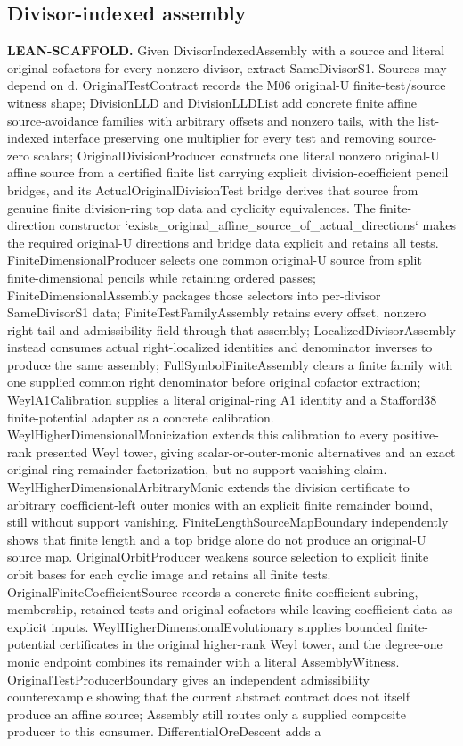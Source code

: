\subsection{Divisor-indexed assembly}\hypertarget{claim:assembly-scaffold}{}\backmap
\textbf{LEAN-SCAFFOLD.} Given DivisorIndexedAssembly with a source and literal original cofactors for every nonzero divisor, extract SameDivisorS1. Sources may depend on d. OriginalTestContract records the M06 original-U finite-test/source witness shape; DivisionLLD and DivisionLLDList add concrete finite affine source-avoidance families with arbitrary offsets and nonzero tails, with the list-indexed interface preserving one multiplier for every test and removing source-zero scalars; OriginalDivisionProducer constructs one literal nonzero original-U affine source from a certified finite list carrying explicit division-coefficient pencil bridges, and its ActualOriginalDivisionTest bridge derives that source from genuine finite division-ring top data and cyclicity equivalences. The finite-direction constructor `exists\_original\_affine\_source\_of\_actual\_directions` makes the required original-U directions and bridge data explicit and retains all tests. FiniteDimensionalProducer selects one common original-U source from split finite-dimensional pencils while retaining ordered passes; FiniteDimensionalAssembly packages those selectors into per-divisor SameDivisorS1 data; FiniteTestFamilyAssembly retains every offset, nonzero right tail and admissibility field through that assembly; LocalizedDivisorAssembly instead consumes actual right-localized identities and denominator inverses to produce the same assembly; FullSymbolFiniteAssembly clears a finite family with one supplied common right denominator before original cofactor extraction; WeylA1Calibration supplies a literal original-ring A1 identity and a Stafford38 finite-potential adapter as a concrete calibration. WeylHigherDimensionalMonicization extends this calibration to every positive-rank presented Weyl tower, giving scalar-or-outer-monic alternatives and an exact original-ring remainder factorization, but no support-vanishing claim. WeylHigherDimensionalArbitraryMonic extends the division certificate to arbitrary coefficient-left outer monics with an explicit finite remainder bound, still without support vanishing. FiniteLengthSourceMapBoundary independently shows that finite length and a top bridge alone do not produce an original-U source map. OriginalOrbitProducer weakens source selection to explicit finite orbit bases for each cyclic image and retains all finite tests. OriginalFiniteCoefficientSource records a concrete finite coefficient subring, membership, retained tests and original cofactors while leaving coefficient data as explicit inputs. WeylHigherDimensionalEvolutionary supplies bounded finite-potential certificates in the original higher-rank Weyl tower, and the degree-one monic endpoint combines its remainder with a literal AssemblyWitness. OriginalTestProducerBoundary gives an independent admissibility counterexample showing that the current abstract contract does not itself produce an affine source; Assembly still routes only a supplied composite producer to this consumer. DifferentialOreDescent adds a 